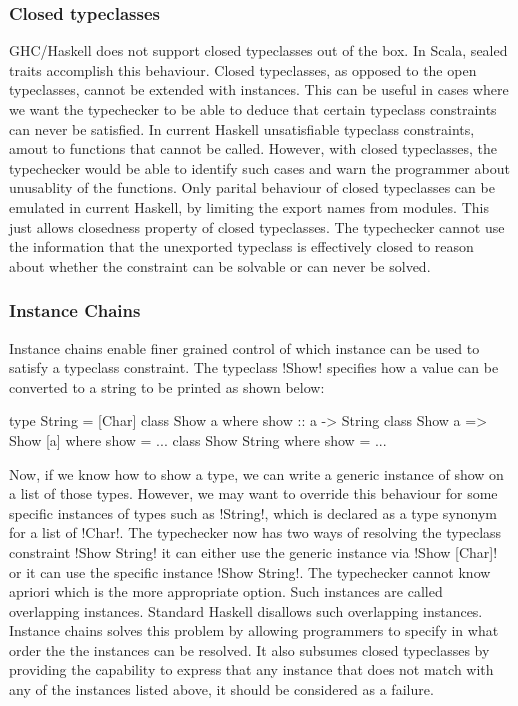 \documentclass[manuscript,screen,nonacm]{acmart}
\begin{document}
\subsubsection{Closed typeclasses}
GHC/Haskell does not support closed typeclasses out of the box. In Scala, sealed traits accomplish this behaviour. Closed typeclasses, as opposed to the open typeclasses, cannot be extended with instances. This can be useful in cases where we want the typechecker to be able to deduce that certain typeclass constraints can never be satisfied. In current Haskell unsatisfiable typeclass constraints, amout to functions that cannot be called. However, with closed typeclasses, the typechecker would be able to identify such cases and warn the programmer about unusablity of the functions. Only parital behaviour of closed typeclasses can be emulated in current Haskell, by limiting the export names from modules. This just allows closedness property of closed typeclasses. The typechecker cannot use the information that the unexported typeclass is effectively closed to reason about whether the constraint can be solvable or can never be solved.

\subsubsection{Instance Chains}
Instance chains\cite{morris_instance_2010} enable finer grained control of which instance can be used to satisfy a typeclass constraint. The typeclass !Show! specifies how a value can be converted to a string to be printed as shown below:

\begin{CenteredBox}
\begin{code}
type String = [Char]
class Show a where show :: a -> String
class Show a => Show [a] where show = ...
class Show String where show = ...
\end{code}
\end{CenteredBox}

Now, if we know how to show a type, we can write a generic instance of show on a list of those types. However, we may want to override this behaviour for some specific instances of types such as !String!, which is declared as a type synonym for a list of !Char!. The typechecker now has two ways of resolving the typeclass constraint !Show String! it can either use the generic instance via !Show [Char]! or it can use the specific instance !Show String!. The typechecker cannot know apriori which is the more appropriate option. Such instances are called overlapping instances. Standard Haskell disallows such overlapping instances. Instance chains solves this problem by allowing programmers to specify in what order the the instances can be resolved. It also subsumes closed typeclasses by providing the capability to express that any instance that does not match with any of the instances listed above, it should be considered as a failure.
\end{document}
